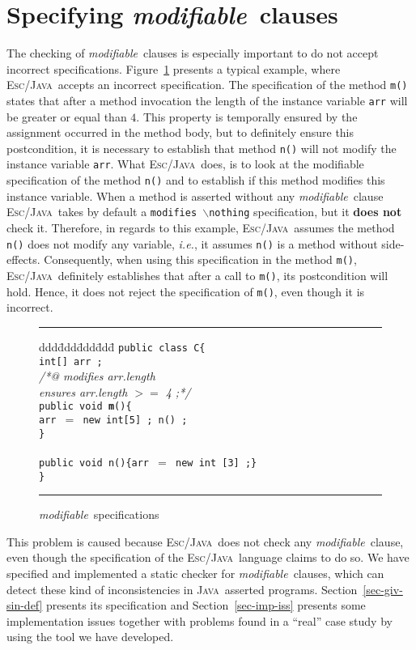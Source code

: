 \documentclass[a4paper]{llncs}
\newcommand{\escj}{\textsc{Esc/Java}}
\newcommand{\java}{\textsc{Java}}
\newcommand{\modif}{\textit{modifiable}}
\begin{document}
\section{Specifying \modif~clauses}
\label{sec-sem-mod-cla}
The checking of \modif~clauses is especially important to do not
accept incorrect specifications. Figure~\ref{fig-mod-spe} presents
a typical example, where \escj~accepts an incorrect specification. The
specification of the method
\texttt{m()} states that after a method invocation the length of the
instance variable \texttt{arr} will be greater or equal than $4$. This
property is temporally ensured by the assignment occurred in the
method body, but to definitely ensure this postcondition, it is
necessary to establish that method \texttt{n()} will not modify the
instance variable \texttt{arr}. What \escj~does, is to look at the
modifiable specification of the method \texttt{n()} and to establish
if this method modifies this instance variable. When a method is
asserted without any \modif~clause \escj~takes by default a
\texttt{modifies $\backslash$nothing} specification, but it {\bf does
not} check it. Therefore, in regards to this example, \escj~assumes
the method \texttt{n()} does not modify any variable, \emph{i.e.}, it
assumes \texttt{n()} is a method without side-effects. Consequently,
when using this specification in the method \texttt{m()},
\escj~definitely establishes that after a call to \texttt{m()}, its
postcondition will hold. Hence, it does not reject the specification of
\texttt{m()}, even though it is incorrect.
\begin{figure}[htb]
\rule{\linewidth}{0.25mm}
\begin{tabbing}
ddd\=ddd\=ddd\=ddd\= \kill 
\texttt{public class C\{} \\
\>\texttt{int[] arr ;} \\
\>\textsl{/*@ modifies arr.length}  \\
\>\>\textsl{ ensures arr.length $>=$ 4 ;*/} \\
\>\texttt{public void {\bf m}()\{} \\
\>\>\texttt{arr $=$ new int[5] ; n() ;} \\
\>\texttt{\}} \\
\\
\>\texttt{public void n()\{arr $=$ new int [3] ;\}} \\
\texttt{\}}
\end{tabbing}
\caption{\modif~specifications} 
\label{fig-mod-spe} 
\rule{\linewidth}{0.25mm} 
\end{figure} 
This problem is caused because \escj~does not check any \modif~clause,
even though the specification of the \escj~language claims to do so. We
have specified and implemented a static checker for \modif~clauses,
which can detect these kind of inconsistencies in \java~asserted
programs. Section~\ref{sec-giv-sin-def} presents its specification
and Section~\ref{sec-imp-iss} presents some implementation
issues together with problems found in a ``real'' case study by
using the tool we have developed.
\end{document}

